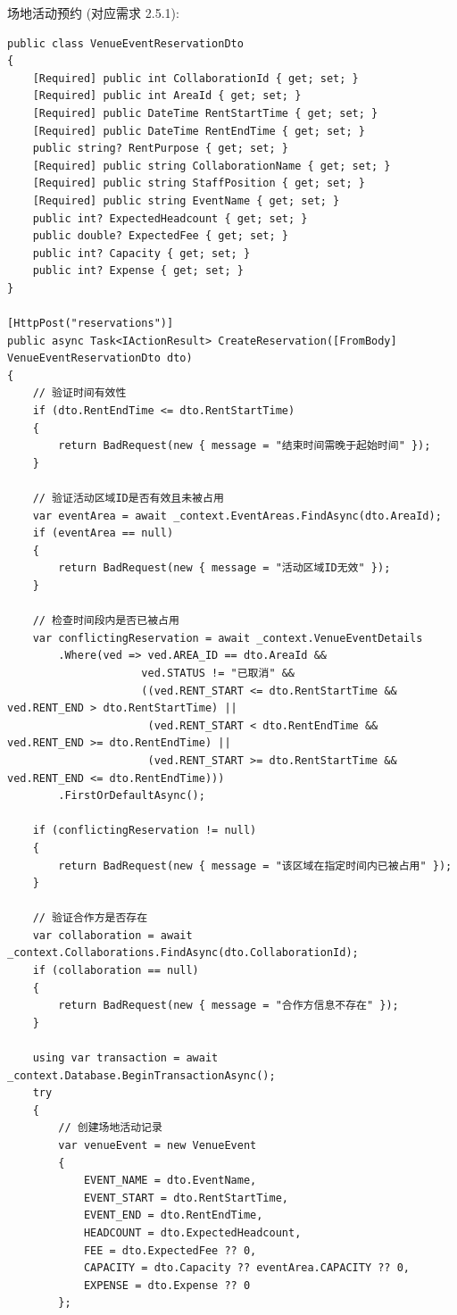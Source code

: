 \documentclass[]{article}
\begin{document}
场地活动预约 (对应需求 2.5.1):
\begin{verbatim}
public class VenueEventReservationDto
{
    [Required] public int CollaborationId { get; set; }
    [Required] public int AreaId { get; set; }
    [Required] public DateTime RentStartTime { get; set; }
    [Required] public DateTime RentEndTime { get; set; }
    public string? RentPurpose { get; set; }
    [Required] public string CollaborationName { get; set; }
    [Required] public string StaffPosition { get; set; }
    [Required] public string EventName { get; set; }
    public int? ExpectedHeadcount { get; set; }
    public double? ExpectedFee { get; set; }
    public int? Capacity { get; set; }
    public int? Expense { get; set; }
}

[HttpPost("reservations")]
public async Task<IActionResult> CreateReservation([FromBody] VenueEventReservationDto dto)
{
    // 验证时间有效性
    if (dto.RentEndTime <= dto.RentStartTime)
    {
        return BadRequest(new { message = "结束时间需晚于起始时间" });
    }

    // 验证活动区域ID是否有效且未被占用
    var eventArea = await _context.EventAreas.FindAsync(dto.AreaId);
    if (eventArea == null)
    {
        return BadRequest(new { message = "活动区域ID无效" });
    }

    // 检查时间段内是否已被占用
    var conflictingReservation = await _context.VenueEventDetails
        .Where(ved => ved.AREA_ID == dto.AreaId &&
                     ved.STATUS != "已取消" &&
                     ((ved.RENT_START <= dto.RentStartTime && ved.RENT_END > dto.RentStartTime) ||
                      (ved.RENT_START < dto.RentEndTime && ved.RENT_END >= dto.RentEndTime) ||
                      (ved.RENT_START >= dto.RentStartTime && ved.RENT_END <= dto.RentEndTime)))
        .FirstOrDefaultAsync();

    if (conflictingReservation != null)
    {
        return BadRequest(new { message = "该区域在指定时间内已被占用" });
    }

    // 验证合作方是否存在
    var collaboration = await _context.Collaborations.FindAsync(dto.CollaborationId);
    if (collaboration == null)
    {
        return BadRequest(new { message = "合作方信息不存在" });
    }

    using var transaction = await _context.Database.BeginTransactionAsync();
    try
    {
        // 创建场地活动记录
        var venueEvent = new VenueEvent
        {
            EVENT_NAME = dto.EventName,
            EVENT_START = dto.RentStartTime,
            EVENT_END = dto.RentEndTime,
            HEADCOUNT = dto.ExpectedHeadcount,
            FEE = dto.ExpectedFee ?? 0,
            CAPACITY = dto.Capacity ?? eventArea.CAPACITY ?? 0,
            EXPENSE = dto.Expense ?? 0
        };


\end{verbatim}
\end{document}
